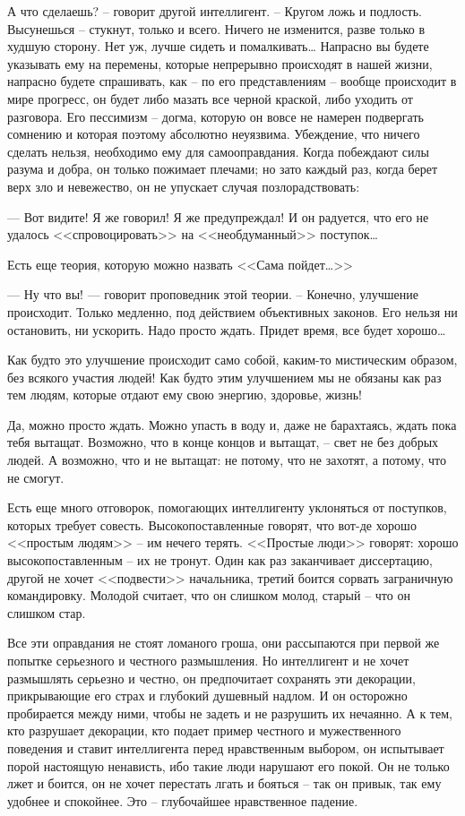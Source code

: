 \documentclass{book}
\begin{document}
А что сделаешь? -- говорит другой интеллигент. -- Кругом ложь и подлость. Высунешься -- стукнут, только и всего. Ни­чего не изменится, разве только в худшую сторону. Нет уж, лучше сидеть и помалкивать\ldots
Напрасно вы будете указывать ему на перемены, которые непрерывно происходят в нашей жизни, напрасно будете спра­шивать, как -- по его представлениям -- вообще происходит в мире прогресс, он будет либо мазать все черной краской, либо уходить от разговора. Его пессимизм -- догма, которую он вовсе не намерен подвергать сомнению и которая поэтому абсолютно неуязвима. Убеждение, что ничего сделать нельзя, необходимо ему для самооправдания. Когда побеждают силы разума и добра, он только пожимает плечами; но зато каж­дый раз, когда берет верх зло и невежество, он не упускает случая позлорадствовать:

--- Вот видите! Я же говорил! Я же предупреждал! И он радуется, что его не удалось <<спровоцировать>> на <<не­обдуманный>> поступок\ldots

Есть еще теория, которую можно назвать <<Сама пойдет\ldots>>

--- Ну что вы! --- говорит проповедник этой теории. -- Конеч­но, улучшение происходит. Только медленно, под действием объективных законов. Его нельзя ни остановить, ни ускорить. Надо просто ждать. Придет время, все будет хорошо\ldots

Как будто это улучшение происходит само собой, каким-то мистическим образом, без всякого участия людей! Как будто этим улучшением мы не обязаны как раз тем людям, которые отдают ему свою энергию, здоровье, жизнь!

Да, можно просто ждать. Можно упасть в воду и, даже не барахтаясь, ждать пока тебя вытащат. Возможно, что в конце концов и вытащат, -- свет не без добрых людей. А возможно, что и не вытащат: не потому, что не захотят, а потому, что не смогут.

Есть еще много отговорок, помогающих интеллигенту уклоняться от поступков, которых требует совесть. Высокопоставленные говорят, что вот-де хорошо <<простым людям>> -- им нечего терять. <<Простые люди>> говорят: хорошо высокопоставленным -- их не тронут. Один как раз заканчивает диссер­тацию, другой не хочет <<подвести>> начальника, третий боится сорвать заграничную командировку. Молодой считает, что он слишком молод, старый -- что он слишком стар.

Все эти оправдания не стоят ломаного гроша, они рассыпа­ются при первой же попытке серьезного и честного размышле­ния. Но интеллигент и не хочет размышлять серьезно и честно, он предпочитает сохранять эти декорации, прикрывающие его страх и глубокий душевный надлом. И он осторожно пробирается между ними, чтобы не задеть и не разрушить их нечаянно. А к тем, кто разрушает декорации, кто подает пример честного и мужественного поведения и ставит интеллигента перед нравственным выбором, он испытывает порой настоящую ненависть, ибо такие люди нарушают его покой. Он не только лжет и боится, он не хочет перестать лгать и бояться -- так он привык, так ему удобнее и спокойнее. Это -- глубочайшее нравственное падение.
\end{document}
